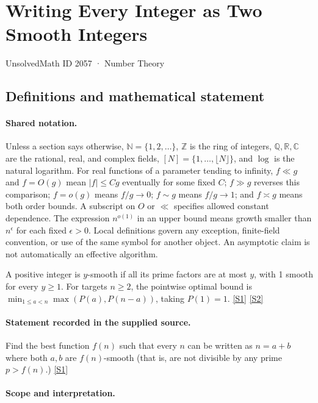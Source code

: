 \documentclass[11pt,a4paper]{article}
\newcommand{\N}{\mathbb{N}}
\newcommand{\Z}{\mathbb{Z}}
\newcommand{\Q}{\mathbb{Q}}
\newcommand{\R}{\mathbb{R}}
\newcommand{\C}{\mathbb{C}}
\newcommand{\sref}[2]{\hyperlink{source:#1:#2}{[S#2]}}
\begin{document}

\setcounter{section}{2056}

\section{Writing Every Integer as Two Smooth Integers}\label{2057}

{\small\sffamily UnsolvedMath ID 2057 · Number Theory}

\subsection{Definitions and mathematical statement}

\paragraph{Shared notation.}Unless a section says otherwise, $\N=\{1,2,\ldots\}$,
$\Z$ is the ring of integers, $\Q,\R,\C$ are the rational, real, and complex
fields, $[N]=\{1,\ldots,\lfloor N\rfloor\}$, and $\log$ is the natural
logarithm. For real functions of a parameter tending to infinity,
$f\ll g$ and $f=O(g)$ mean $|f|\leq Cg$ eventually for some fixed $C$;
$f\gg g$ reverses this comparison; $f=o(g)$ means $f/g\to0$;
$f\sim g$ means $f/g\to1$; and $f\asymp g$ means both order bounds.
A subscript on $O$ or $\ll$ specifies allowed constant dependence.
The expression $n^{o(1)}$ in an upper bound means growth smaller than
$n^\epsilon$ for each fixed $\epsilon>0$. Local definitions govern any
exception, finite-field convention, or use of the same symbol for another
object. An asymptotic claim is not automatically an effective algorithm.



A positive integer is $y$-smooth if all its prime factors are at most $y$, with 1 smooth for every $y\geq1$. For targets $n\geq2$, the pointwise optimal bound is $\min_{1\leq a<n}\max(P(a),P(n-a))$, taking $P(1)=1$. \sref{2057}{1} \sref{2057}{2}

\paragraph{Statement recorded in the supplied source.}
Find the best function $f(n)$ such that every $n$ can be written as $n=a+b$ where both $a,b$ are $f(n)$-smooth (that is, are not divisible by any prime $p>f(n)$.) \sref{2057}{1}

\paragraph{Scope and interpretation.}
\end{document}
